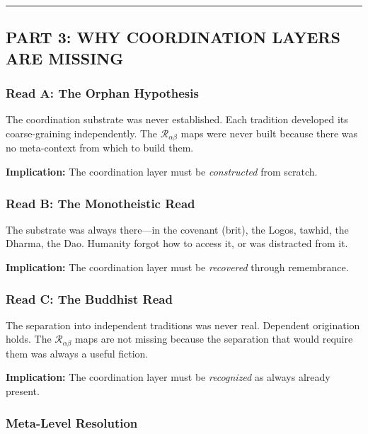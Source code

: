 \documentclass[
]{article}
\begin{document}
\begin{center}\rule{0.5\linewidth}{0.5pt}\end{center}

\subsection{PART 3: WHY COORDINATION LAYERS ARE
MISSING}\label{part-3-why-coordination-layers-are-missing}

\subsubsection{Read A: The Orphan
Hypothesis}\label{read-a-the-orphan-hypothesis}

The coordination substrate was never established. Each tradition
developed its coarse-graining independently. The
\(\mathcal{R}_{\alpha\beta}\) maps were never built because there was no
meta-context from which to build them.

\textbf{Implication:} The coordination layer must be \emph{constructed}
from scratch.

\subsubsection{Read B: The Monotheistic
Read}\label{read-b-the-monotheistic-read}

The substrate was always there---in the covenant (brit), the Logos,
tawhid, the Dharma, the Dao. Humanity forgot how to access it, or was
distracted from it.

\textbf{Implication:} The coordination layer must be \emph{recovered}
through remembrance.

\subsubsection{Read C: The Buddhist
Read}\label{read-c-the-buddhist-read}

The separation into independent traditions was never real. Dependent
origination holds. The \(\mathcal{R}_{\alpha\beta}\) maps are not
missing because the separation that would require them was always a
useful fiction.

\textbf{Implication:} The coordination layer must be \emph{recognized}
as always already present.

\subsubsection{Meta-Level Resolution}\label{meta-level-resolution}
\end{document}
